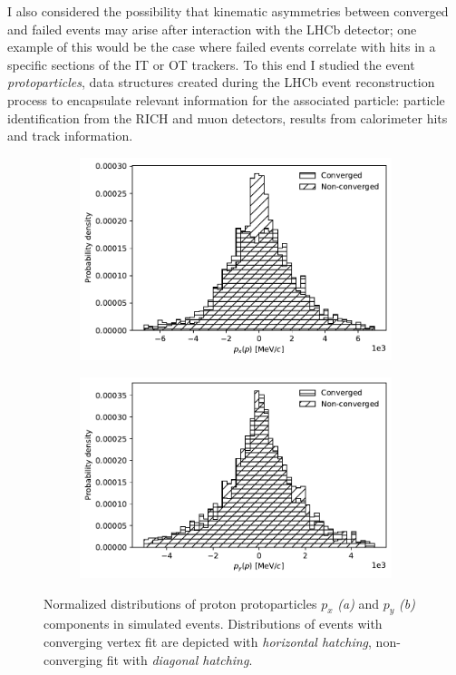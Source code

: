 I also considered the possibility that kinematic asymmetries between converged and failed events may arise after interaction with the LHCb detector;
one example of this would be the case where failed events correlate with hits in a specific sections of the IT or OT trackers.
To this end I studied the event \textit{protoparticles}, data structures created during the LHCb event reconstruction process to encapsulate relevant information for the associated particle:
particle identification from the RICH and muon detectors, results from calorimeter hits and track information.

\begin{figure}[t]
	\centering
	\begin{subfigure}{.45\textwidth}
		\includegraphics[width=\textwidth]{graphics/03-vertex_reconstruction/p_momentum_x.pdf}
		\caption{}
		\label{fig:3:p_momentum_x}
	\end{subfigure}
	\begin{subfigure}{.45\textwidth}
		\includegraphics[width=\textwidth]{graphics/03-vertex_reconstruction/p_momentum_y.pdf}
		\caption{}
		\label{fig:3:p_momentum_y}
	\end{subfigure}
	\caption{Normalized distributions of proton protoparticles $p_x$ \textit{(a)} and $p_y$ \textit{(b)} components in simulated \lambdadecay events. Distributions of events with converging vertex fit are depicted with \textit{horizontal hatching}, non-converging fit with \textit{diagonal hatching}.}
	\label{fig:3:p_protoparticle_momenta}
\end{figure}

